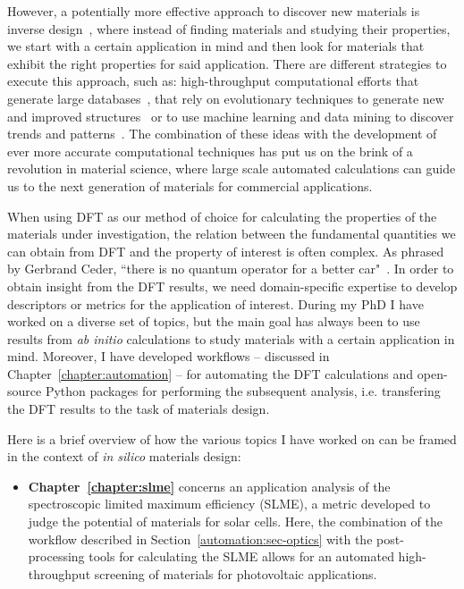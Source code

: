 \begin{refsection}
However, a potentially more effective approach to discover new materials is 
inverse design~\cite{Zunger2018}, where instead of finding materials and studying 
their properties, we start with a certain application in mind and then look for 
materials that exhibit the right properties for said application. There are 
different strategies to execute this approach, such as: high-throughput 
computational efforts that generate large databases~\cite{Curtarolo2013, Jain2011}, 
that rely on evolutionary techniques to generate new and improved 
structures~\cite{Oganov2018} or to use machine learning and data mining to discover 
trends and patterns~\cite{Draxl2019}. The combination of these ideas with the 
development of ever more accurate computational techniques has put us on the brink of a revolution in material science, where large scale automated calculations can guide us to the next generation of materials for commercial applications.

When using DFT as our method of choice for calculating the properties of the materials under investigation, the relation between the fundamental quantities we can obtain from DFT and the property of interest is often complex. As phrased by Gerbrand Ceder, ``there is no quantum operator for a better car"~\cite{Ceder2010}. In order to obtain insight from the DFT results, we need domain-specific expertise to develop descriptors or metrics for the application of interest. During my PhD I have worked on a diverse set of topics, but the main goal has always been to use results from \textit{ab initio} calculations to study materials with a certain application in mind. Moreover, I have developed workflows -- discussed in Chapter~\ref{chapter:automation} -- for automating the DFT calculations and open-source Python packages for performing the subsequent analysis, i.e. transfering the DFT results to the task of materials design. 

Here is a brief overview of how the various topics I have worked on can be framed in the context of \textit{in silico} materials design:

\begin{itemize}[]

\item \textbf{Chapter~\ref{chapter:slme}} concerns an application analysis of the spectroscopic limited maximum efficiency (SLME), a metric developed to judge the potential of materials for solar cells. Here, the combination of the workflow described in Section~\ref{automation:sec-optics} with the post-processing tools for calculating the SLME allows for an automated high-throughput screening of materials for photovoltaic applications.


\end{itemize}
\end{refsection}
